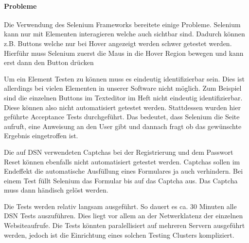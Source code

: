 \paragraph{Probleme}
Die Verwendung des Selenium Frameworks bereitete einige Probleme. Selenium kann nur mit Elementen interagieren welche auch sichtbar sind. Dadurch können z.B. Buttons welche nur bei Hover angezeigt werden schwer getestet werden. Hierführ muss Selenium zuerst die Maus in die Hover Region bewegen und kann erst dann den Button drücken 

Um ein Element Testen zu können muss es eindeutig identifizierbar sein. Dies ist allerdings bei vielen Elementen in unserer Software nicht möglich. Zum Beispiel sind die einzelnen Buttons im Texteditor im Heft nicht eindeutig identifizierbar. Diese können also nicht automatisiert getestet werden. Stattdessen wurden hier geführte Acceptance Tests durchgeführt. Das bedeutet, dass Selenium die Seite aufruft, eine Anweisung an den User gibt und dannach fragt ob das gewünschte Ergebnis eingetroffen ist. 

Die auf DSN verwendeten Captchas bei der Registrierung und dem Passwort Reset können ebenfalls nicht automatisiert getestet werden. Captchas sollen im Endeffekt die automatische Ausfüllung eines Formulares ja auch verhindern. Bei einem Test füllt Selenium das Formular bis auf das Captcha aus. Das Captcha muss dann händisch gelöst werden. 

Die Tests werden relativ langsam ausgeführt. So dauert es ca. 30 Minuten alle DSN Tests auszuführen. Dies liegt vor allem an der Netwerklatenz der einzelnen Websiteaufrufe. Die Tests könnten paralellisiert auf mehreren Servern ausgeführt werden, jedoch ist die Einrichtung eines solchen Testing Clusters kompliziert.
